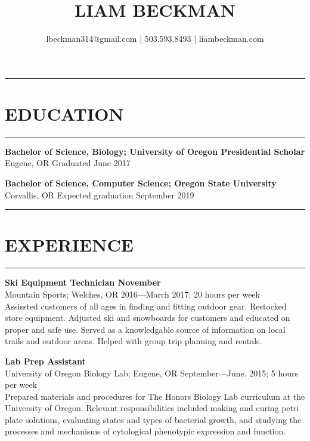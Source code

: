 \documentclass[a4paper]{article}
\title{LIAM BECKMAN}
\author{lbeckman314@gmail.com | 503.593.8493 | liambeckman.com}
\date{\vspace{-5ex}}
\begin{document}
\maketitle

\noindent\rule{\textwidth}{1pt}\vspace{-1.5em}
\section*{EDUCATION}\vspace{-1.5em}
\textcolor[RGB]{128,128,128}{\rule{\linewidth}{1pt}}

\medskip

\textbf{Bachelor of Science, Biology; University of Oregon Presidential Scholar}\\ 
\textcolor[RGB]{128,128,128}{Eugene, OR \hfill Graduated June 2017}

\medskip


\textbf{Bachelor of Science, Computer Science; Oregon State University}\\ 
\textcolor[RGB]{128,128,128}{Corvallis, OR \hfill Expected graduation September 2019}


\noindent\rule{\textwidth}{1pt}\vspace{-1.5em}
\section*{EXPERIENCE}\vspace{-1.5em}
\textcolor[RGB]{128,128,128}{\rule{\linewidth}{1pt}}

\medskip

\textbf{Ski Equipment Technician November}\\
\textcolor[RGB]{128,128,128}{Mountain Sports; Welches, OR \hfill 2016—March 2017; 20 hours per week}\\
Assissted customers of all ages in finding and fitting outdoor gear. Restocked store equipment. Adjusted ski and snowboards for customers and educated on proper and safe use. Served as a knowledgable source of information on local trails and outdoor areas. Helped with group trip planning and rentals.

\medskip

\textbf{Lab Prep Assistant}\\
\textcolor[RGB]{128,128,128}{University of Oregon Biology Lab; Eugene, OR \hfill September—June. 2015; 5 hours per week}\\
Prepared materials and procedures for The Honors Biology Lab curriculum at the University of Oregon. Relevant responsibilities included making and curing petri plate solutions, evaluating states and types of bacterial growth, and studying the processes and mechanisms of cytological phenotypic expression and function.
\end{document}
